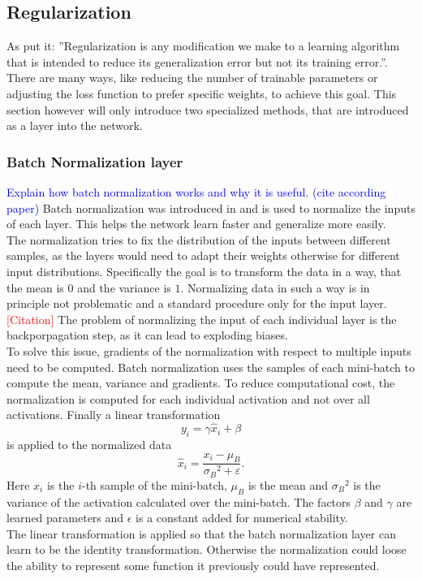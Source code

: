 \subsection{Regularization}\label{sec:regularization}
As \cite{deep_learning_book} put it: ''Regularization is any modification we make to a learning algorithm that is intended to reduce its generalization error but not its training error.''. There are many ways, like reducing the number of trainable parameters or adjusting the loss function to prefer specific weights, to achieve this goal. This section however will only introduce two specialized methods, that are introduced as a layer into the network.

\subsubsection{Batch Normalization layer}\label{sec:batch_norm}
\textcolor{blue}{Explain how batch normalization works and why it is useful. (cite according paper)}
Batch normalization was introduced in \cite{batch_normalization_invention} and is used to normalize the inputs of each layer. This helps the network learn faster and generalize more easily.\\
The normalization tries to fix the distribution of the inputs between different samples, as the layers would need to adapt their weights otherwise for different input distributions. Specifically the goal is to transform the data in a way, that the mean is $0$ and the variance is $1$. Normalizing data in such a way is in principle not problematic and a standard procedure only for the input layer. \textcolor{red}{[Citation]} The problem of normalizing the input of each individual layer is the backporpagation step, as it can lead to exploding biases. \cite{batch_normalization_invention}\\
To solve this issue, gradients of the normalization with respect to multiple inputs need to be computed. Batch normalization uses the samples of each mini-batch to compute the mean, variance and gradients. To reduce computational cost, the normalization is computed for each individual activation and not over all activations. Finally a linear transformation
\begin{equation}
y_i = \gamma \hat{x}_i + \beta
\end{equation}
is applied to the normalized data
\begin{equation}
\hat{x}_i = \frac{x_i - \mu_B}{{\sigma_B}^2 + \varepsilon}.
\end{equation}
Here $x_i$ is the $i$-th sample of the mini-batch, $\mu_B$ is the mean and ${\sigma_B}^2$ is the variance of the activation calculated over the mini-batch. The factors $\beta$ and $\gamma$ are learned parameters and $\epsilon$ is a constant added for numerical stability.\\
The linear transformation is applied so that the batch normalization layer can learn to be the identity transformation. Otherwise the normalization could loose the ability to represent some function it previously could have represented.

